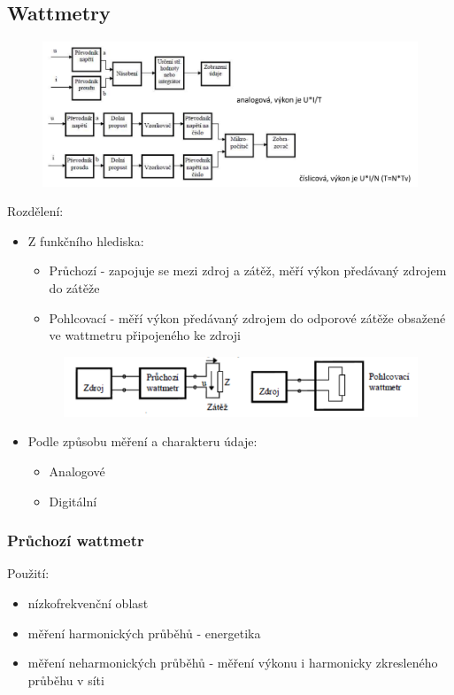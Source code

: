 \subsection*{Wattmetry}
\begin{figure}[H]
    \includegraphics*[scale = 1]{images/wattSchemata.png}
\end{figure}
Rozdělení:
\begin{itemize}
    \item Z funkčního hlediska:
    \begin{itemize}
        \item Průchozí - zapojuje se mezi zdroj a zátěž, měří výkon předávaný zdrojem do zátěže
        \item Pohlcovací - měří výkon předávaný zdrojem do odporové zátěže obsažené ve wattmetru připojeného ke zdroji
    \end{itemize}
    \begin{figure}[H]
        \includegraphics*[scale  = 1]{images/wattTypy.png}
    \end{figure}
    \item Podle způsobu měření a charakteru údaje:
    \begin{itemize}
        \item Analogové
        \item Digitální 
    \end{itemize}
\end{itemize}

\subsubsection*{Průchozí wattmetr}
Použití:
\begin{itemize}
    \item nízkofrekvenční oblast
    \item měření harmonických průběhů - energetika 
    \item měření neharmonických průběhů - měření výkonu i harmonicky zkresleného průběhu v síti
\end{itemize}



